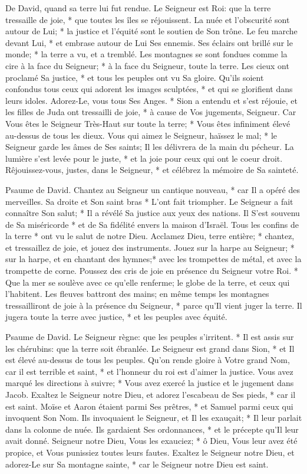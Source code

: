 De David, quand sa terre lui fut rendue. Le Seigneur est Roi: que la terre tressaille de joie, * que toutes les îles se réjouissent.
La nuée et l'obscurité sont autour de Lui; * la justice et l'équité sont le soutien de Son trône.
Le feu marche devant Lui, * et embrase autour de Lui Ses ennemis.
Ses éclairs ont brillé sur le monde; * la terre a vu, et a tremblé.
Les montagnes se sont fondues comme la cire à la face du Seigneur; * à la face du Seigneur, toute la terre.
Les cieux ont proclamé Sa justice, * et tous les peuples ont vu Sa gloire.
Qu'ils soient confondus tous ceux qui adorent les images sculptées, * et qui se glorifient dans leurs idoles. Adorez-Le, vous tous Ses Anges. *
Sion a entendu et s'est réjouie, et les filles de Juda ont tressailli de joie, * à cause de Vos jugements, Seigneur.
Car Vous êtes le Seigneur Très-Haut sur toute la terre; * Vous êtes infiniment élevé au-dessus de tous les dieux.
Vous qui aimez le Seigneur, haïssez le mal; * le Seigneur garde les âmes de Ses saints; Il les délivrera de la main du pécheur.
La lumière s'est levée pour le juste, * et la joie pour ceux qui ont le coeur droit.
Rêjouissez-vous, justes, dans le Seigneur, * et célébrez la mémoire de Sa sainteté.

Psaume de David. Chantez au Seigneur un cantique nouveau, * car Il a opéré des merveilles. Sa droite et Son saint bras * L'ont fait triompher.
Le Seigneur a fait connaître Son salut; * Il a révélé Sa justice aux yeux des nations.
Il S'est souvenu de Sa miséricorde * et de Sa fidélité envers la maison d'Israël. Tous les confins de la terre * ont vu le salut de notre Dieu.
Acclamez Dieu, terre entière; * chantez, et tressaillez de joie, et jouez des instruments.
Jouez sur la harpe au Seigneur; * sur la harpe, et en chantant des hymnes;*
avec les trompettes de métal, et avec la trompette de corne. Poussez des cris de joie en présence du Seigneur votre Roi. *
Que la mer se soulève avec ce qu'elle renferme; le globe de la terre, et ceux qui l'habitent.
Les fleuves battront des mains; en même temps les montagnes tressailliront de joie
à la présence du Seigneur, * parce qu'Il vient juger la terre. Il jugera toute la terre avec justice, * et les peuples avec équité.

Psaume de David. Le Seigneur règne: que les peuples s'irritent. * Il est assis sur les chérubins: que la terre soit ébranlée.
Le Seigneur est grand dans Sion, * et Il est élevé au-dessus de tous les peuples.
Qu'on rende gloire à Votre grand Nom, car il est terrible et saint, *
et l'honneur du roi est d'aimer la justice. Vous avez marqué les directions à suivre; * Vous avez exercé la justice et le jugement dans Jacob.
Exaltez le Seigneur notre Dieu, et adorez l'escabeau de Ses pieds, * car il est saint.
Moïse et Aaron étaient parmi Ses prêtres, * et Samuel parmi ceux qui invoquent Son Nom. Ils invoquaient le Seigneur, et Il les exauçait; *
Il leur parlait dans la colonne de nuée. Ils gardaient Ses ordonnances, * et le précepte qu'Il leur avait donné.
Seigneur notre Dieu, Vous les exauciez; * ô Dieu, Vous leur avez été propice, et Vous punissiez toutes leurs fautes.
Exaltez le Seigneur notre Dieu, et adorez-Le sur Sa montagne sainte, * car le Seigneur notre Dieu est saint.

